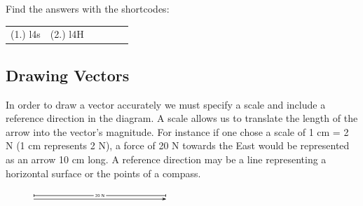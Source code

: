         

      
    
    \label{m38812*cid6}
\par {} Find the answers with the shortcodes:
 \par \begin{tabular}[h]{cccccc}
 (1.) l4s  &  (2.) l4H  & \end{tabular}



            \subsection{ Drawing Vectors}
            \nopagebreak
            
      
      \label{m38812*id187709}In order to draw a vector accurately we must specify a scale and
include a reference direction in the diagram. A scale allows us to
translate the length of the arrow into the vector's magnitude. For
instance if one chose a scale of 1 cm = 2 N (1 cm represents 2 N), a
force of 20 N towards the East would be represented as an arrow 10 cm
long. A reference direction may be a line representing a horizontal surface or the points of a compass.\par 
      \label{m38812*id187716}
        
    \setcounter{subfigure}{0}


	\begin{figure}[H] %
    \begin{center}
    \label{m38812*id187719!!!underscore!!!media}\label{m38812*id187719!!!underscore!!!printimage}\includegraphics[width=5cm]{col11305.imgs/m38812_PG11C1_010.png} %
        
      \vspace{2pt}
    \vspace{.1in}
    
    \end{center}

 \end{figure}   

    \addtocounter{footnote}{-0}
    
